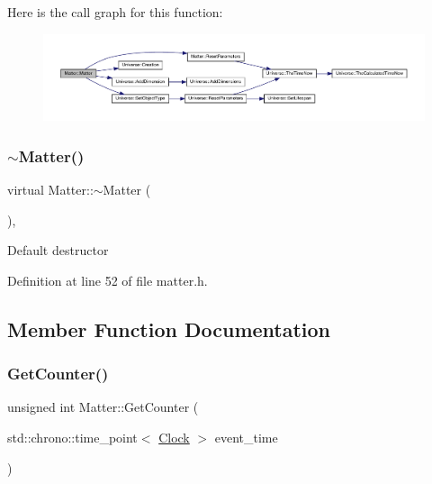 Here is the call graph for this function\+:\nopagebreak
\begin{figure}[H]
\begin{center}
\leavevmode
\includegraphics[width=350pt]{class_matter_a724543a0439d3099f5fc0eae68110b75_cgraph}
\end{center}
\end{figure}
\mbox{\label{class_matter_a646fca3d4176950aed6173e1378664e3}} 
\subsubsection{\texorpdfstring{$\sim$\+Matter()}{~Matter()}}
{\footnotesize\ttfamily virtual Matter\+::$\sim$\+Matter (\begin{DoxyParamCaption}{ }\end{DoxyParamCaption})\hspace{0.3cm}{\ttfamily [inline]}, {\ttfamily [virtual]}}

Default destructor 

Definition at line 52 of file matter.\+h.



\subsection{Member Function Documentation}
\mbox{\label{class_matter_ac667a2f3b6d5d2ce8469efe1596cdd62}} 
\subsubsection{\texorpdfstring{Get\+Counter()}{GetCounter()}}
{\footnotesize\ttfamily unsigned int Matter\+::\+Get\+Counter (\begin{DoxyParamCaption}\item[{std\+::chrono\+::time\+\_\+point$<$ \mbox{\hyperlink{universe_8h_a0ef8d951d1ca5ab3cfaf7ab4c7a6fd80}{Clock}} $>$}]{event\+\_\+time }\end{DoxyParamCaption})\hspace{0.3cm}{\ttfamily [inline]}}



